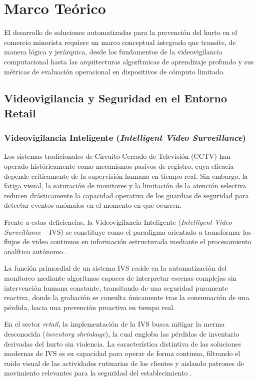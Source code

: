 \section{Marco Teórico}

El desarrollo de soluciones automatizadas para la prevención del hurto en el comercio minorista requiere un marco conceptual integrado que transite, de manera lógica y jerárquica, desde los fundamentos de la videovigilancia computacional hasta las arquitecturas algorítmicas de aprendizaje profundo y sus métricas de evaluación operacional en dispositivos de cómputo limitado.

\subsection{Videovigilancia y Seguridad en el Entorno Retail}

\subsubsection{Videovigilancia Inteligente (\textit{Intelligent Video Surveillance})}

Los sistemas tradicionales de Circuito Cerrado de Televisión (CCTV) han operado históricamente como mecanismos pasivos de registro, cuya eficacia depende críticamente de la supervisión humana en tiempo real. Sin embargo, la fatiga visual, la saturación de monitores y la limitación de la atención selectiva reducen drásticamente la capacidad operativa de los guardias de seguridad para detectar eventos anómalos en el momento en que ocurren.

Frente a estas deficiencias, la Videovigilancia Inteligente (\textit{Intelligent Video Surveillance} -- IVS) se constituye como el paradigma orientado a transformar los flujos de video continuos en información estructurada mediante el procesamiento analítico autónomo \cite{anikwe-onyiwa_recent_2025}.

La función primordial de un sistema IVS reside en la automatización del monitoreo mediante algoritmos capaces de interpretar escenas complejas sin intervención humana constante, transitando de una seguridad puramente reactiva, donde la grabación se consulta únicamente tras la consumación de una pérdida, hacia una prevención proactiva en tiempo real.

En el sector \textit{retail}, la implementación de la IVS busca mitigar la merma desconocida (\textit{inventory shrinkage}), la cual engloba las pérdidas de inventario derivadas del hurto sin violencia. La característica distintiva de las soluciones modernas de IVS es su capacidad para operar de forma continua, filtrando el ruido visual de las actividades rutinarias de los clientes y aislando patrones de movimiento relevantes para la seguridad del establecimiento \cite{hameed_real_2025}.

